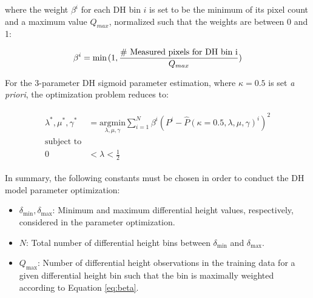 \noindent where the weight $\beta^i$ for each DH bin $i$ is set to be the minimum of its pixel count and a maximum value $Q_{max}$, normalized such that the weights are between 0 and 1:

\begin{equation}
\beta^{i} = \text{min}\hspace{0.3ex}(1, \frac{\text{\# Measured pixels for DH bin i}}{Q_{max}})
\label{eq:beta}
\end{equation}

For the 3-parameter DH sigmoid parameter estimation, where $\kappa = 0.5$ is set \emph{a priori}, the optimization problem reduces to:

\begin{align}
\begin{split} 
\lambda^*, \mu^*, \gamma^* &= \underset{\lambda, \mu, \gamma}{\text{argmin}} \sum_{i=1}^{N} \beta^i (P^{i} - \hat{P}(\kappa = 0.5, \lambda, \mu, \gamma)^{i})^2 \\
\text{subject to}& \\
0 &< \lambda < \frac{1}{2}
\label{eq:opt3}
\end{split}
\end{align}  

In summary, the following constants must be chosen in order to conduct the DH model parameter optimization:

\begin{itemize}
\item \textbf{$\delta_{\text{min}}, \delta_{\text{max}}$}: Minimum and maximum differential height values, respectively, considered in the parameter optimization.
\item \textbf{$N$}: Total number of differential height bins between $\delta_{\text{min}}$ and $\delta_{\text{max}}$.
\item \textbf{$Q_{\text{max}}$}: Number of differential height observations in the training data for a given differential height bin such that the bin is maximally weighted according to Equation \ref{eq:beta}. 
\end{itemize}
